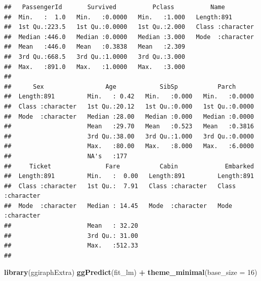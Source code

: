\documentclass[
  12pt,
]{book}
\newenvironment{Shaded}{\begin{snugshade}}{\end{snugshade}}
\newcommand{\DataTypeTok}[1]{\textcolor[rgb]{0.13,0.29,0.53}{#1}}
\newcommand{\DecValTok}[1]{\textcolor[rgb]{0.00,0.00,0.81}{#1}}
\newcommand{\KeywordTok}[1]{\textcolor[rgb]{0.13,0.29,0.53}{\textbf{#1}}}
\newcommand{\NormalTok}[1]{#1}
\newcommand{\OperatorTok}[1]{\textcolor[rgb]{0.81,0.36,0.00}{\textbf{#1}}}
\newcommand{\StringTok}[1]{\textcolor[rgb]{0.31,0.60,0.02}{#1}}
\theoremstyle{definition}
\theoremstyle{definition}
\theoremstyle{definition}
\theoremstyle{remark}
\begin{document}
\begin{verbatim}
##   PassengerId       Survived          Pclass          Name          
##  Min.   :  1.0   Min.   :0.0000   Min.   :1.000   Length:891        
##  1st Qu.:223.5   1st Qu.:0.0000   1st Qu.:2.000   Class :character  
##  Median :446.0   Median :0.0000   Median :3.000   Mode  :character  
##  Mean   :446.0   Mean   :0.3838   Mean   :2.309                     
##  3rd Qu.:668.5   3rd Qu.:1.0000   3rd Qu.:3.000                     
##  Max.   :891.0   Max.   :1.0000   Max.   :3.000                     
##                                                                     
##      Sex                 Age            SibSp           Parch       
##  Length:891         Min.   : 0.42   Min.   :0.000   Min.   :0.0000  
##  Class :character   1st Qu.:20.12   1st Qu.:0.000   1st Qu.:0.0000  
##  Mode  :character   Median :28.00   Median :0.000   Median :0.0000  
##                     Mean   :29.70   Mean   :0.523   Mean   :0.3816  
##                     3rd Qu.:38.00   3rd Qu.:1.000   3rd Qu.:0.0000  
##                     Max.   :80.00   Max.   :8.000   Max.   :6.0000  
##                     NA's   :177                                     
##     Ticket               Fare           Cabin             Embarked        
##  Length:891         Min.   :  0.00   Length:891         Length:891        
##  Class :character   1st Qu.:  7.91   Class :character   Class :character  
##  Mode  :character   Median : 14.45   Mode  :character   Mode  :character  
##                     Mean   : 32.20                                        
##                     3rd Qu.: 31.00                                        
##                     Max.   :512.33                                        
## 
\end{verbatim}

\begin{Shaded}
\end{Shaded}

\begin{Shaded}
\begin{Highlighting}[]
\KeywordTok{library}\NormalTok{(ggiraphExtra)}
\KeywordTok{ggPredict}\NormalTok{(fit_lm) }\OperatorTok{+}\StringTok{ }\KeywordTok{theme_minimal}\NormalTok{(}\DataTypeTok{base_size =} \DecValTok{16}\NormalTok{)}
\end{Highlighting}
\end{Shaded}
\end{document}
